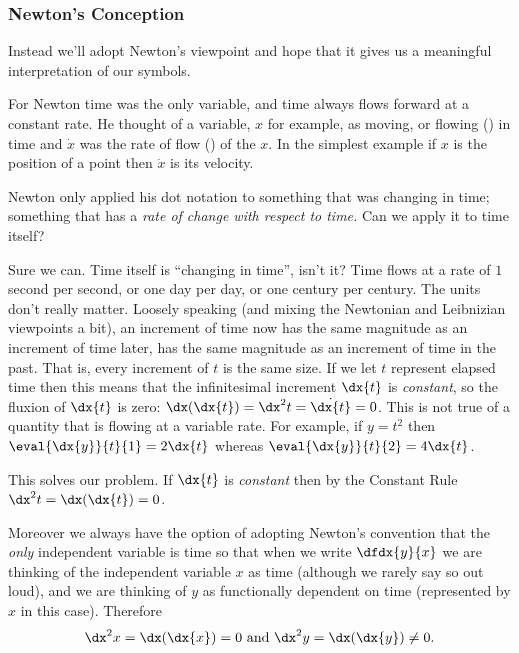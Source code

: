 \begin{Digression}
  \subsubsection*{Newton's Conception}
  Instead we'll adopt Newton's viewpoint and hope that it gives us a
  meaningful interpretation of our symbols.
  
  For Newton time was the only variable, and time always flows forward
  at a constant rate. He thought of a variable, $x$ for
  example, as moving, or flowing () in time and
  $\dot{x}$ was the rate of flow () of the
   $x$. In the simplest example if $x$ is the position
  of a point then $\dot{x}$ is its velocity.

  Newton only applied his dot notation to something that was changing
  in time; something that has a \emph{rate of change with respect to
    time.} Can we apply it to time itself?

  Sure we can. Time itself is ``changing in time'', isn't it? Time
  flows at a rate of $1$ second per second, or one day per day, or one
  century per century. The units don't really matter. Loosely speaking
  (and mixing the Newtonian and Leibnizian viewpoints a bit), an
  increment of time now has the same magnitude as an increment of time
  later, has the same magnitude as an increment of time in the
  past. That is, every increment of $t$ is the same size.  If we let
  $t$ represent elapsed time then this means that the infinitesimal
  increment $\dx{t}$ is \emph{constant}, so the fluxion of $\dx{t}$ is
  zero: $\dx(\dx{t})=\dx^2{t}=\dot{\dx{t}}=0$.  This is not true of a quantity that is
  flowing at a variable rate. For example, if $y=t^2$ then
  $\eval{\dx{y}}{t}{1}=2\dx{t}$ whereas $\eval{\dx{y}}{t}{2}=4\dx{t}$.

  This solves our problem. If $\dx{t}$ is \emph{constant} then by the
  Constant Rule $\dx^2{t}=\dx(\dx{t})=0$.

  Moreover we always have the option of adopting Newton's convention
  that the \emph{only} independent variable is time so that when we
  write $\dfdx{y}{x}$ we are thinking of  the independent
  variable $x$ as time (although we rarely say so out loud), and we are
  thinking of $y$ as functionally dependent on time (represented by
  $x$ in this case).  Therefore
  $$\dx^2x=\dx(\dx{x})=0 \text{ and } \dx^2y=\dx(\dx{y})\neq0.$$


\end{Digression}

